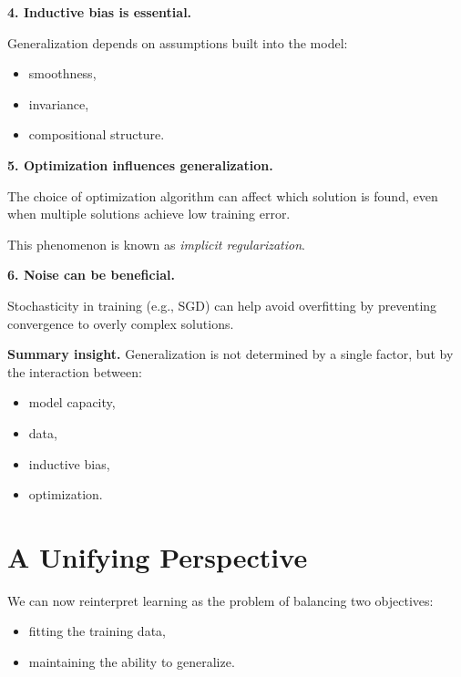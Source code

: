 \noindent
\textbf{4. Inductive bias is essential.}

\medskip

\noindent
Generalization depends on assumptions built into the model:
\begin{itemize}
    \item smoothness,
    \item invariance,
    \item compositional structure.
\end{itemize}

\medskip

\noindent
\textbf{5. Optimization influences generalization.}

\medskip

\noindent
The choice of optimization algorithm can affect which solution is found, even when multiple solutions achieve low training error.

\medskip

\noindent
This phenomenon is known as \emph{implicit regularization}.

\medskip

\noindent
\textbf{6. Noise can be beneficial.}

\medskip

\noindent
Stochasticity in training (e.g., SGD) can help avoid overfitting by preventing convergence to overly complex solutions.

\medskip

\noindent
\textbf{Summary insight.}  
Generalization is not determined by a single factor, but by the interaction between:
\begin{itemize}
    \item model capacity,
    \item data,
    \item inductive bias,
    \item optimization.
\end{itemize}

\section{A Unifying Perspective}

We can now reinterpret learning as the problem of balancing two objectives:
\begin{itemize}
    \item fitting the training data,
    \item maintaining the ability to generalize.
\end{itemize}

